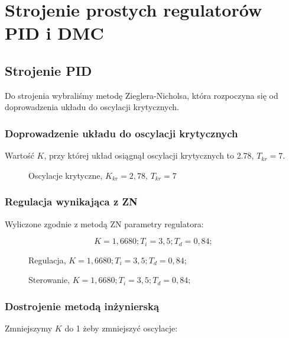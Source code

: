 \chapter{Strojenie prostych regulatorów PID i DMC}

\section{Strojenie PID}

Do strojenia wybraliśmy metodę Zieglera-Nicholsa, która rozpoczyna się od doprowadzenia układu do oscylacji krytycznych.

\subsection{Doprowadzenie układu do oscylacji krytycznych}

Wartość $K$, przy której układ osiągnął oscylacji krytycznych to \num{2,78}, $T_{kr} = 7$. 

\begin{figure}[H]
\centering

\caption{Oscylacje krytyczne, $K_{kr} = 2,78$, $T_{kr} = 7$}
\end{figure}

\subsection{Regulacja wynikająca z ZN}

Wyliczone zgodnie z metodą ZN parametry regulatora:

\begin{equation}
    K = 1,6680; T_i=3,5; T_d=0,84; 
\end{equation}

\begin{figure}[H]
\centering

\caption{Regulacja, $K = 1,6680; T_i=3,5; T_d=0,84;$}
\end{figure}

\begin{figure}[H]
\centering

\caption{Sterowanie, $K = 1,6680; T_i=3,5; T_d=0,84;$}
\end{figure}

\subsection{Dostrojenie metodą inżynierską}

Zmniejszymy $K$ do 1 żeby zmniejszyć oscylacje:

